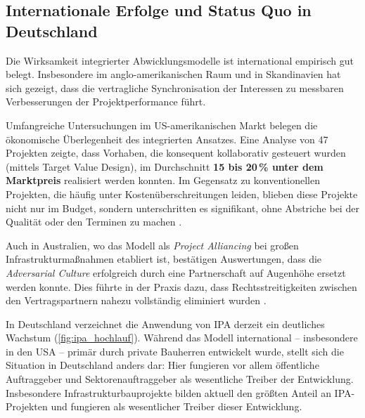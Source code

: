 \subsection{Internationale Erfolge und Status Quo in Deutschland}
\label{sec:2.2.3}

Die Wirksamkeit integrierter Abwicklungsmodelle ist international empirisch gut belegt. Insbesondere im anglo-amerikanischen Raum und in Skandinavien hat sich gezeigt, dass die vertragliche Synchronisation der Interessen zu messbaren Verbesserungen der Projektperformance führt.

Umfangreiche Untersuchungen im US-amerikanischen Markt belegen die ökonomische Überlegenheit des integrierten Ansatzes. Eine Analyse von 47 Projekten zeigte, dass Vorhaben, die konsequent kollaborativ gesteuert wurden (mittels Target Value Design), im Durchschnitt \textbf{15 bis 20\,\% unter dem Marktpreis} realisiert werden konnten. Im Gegensatz zu konventionellen Projekten, die häufig unter Kostenüberschreitungen leiden, blieben diese Projekte nicht nur im Budget, sondern unterschritten es signifikant, ohne Abstriche bei der Qualität oder den Terminen zu machen \autocite[Vgl.][S.~176]{do_target_2014}.

Auch in Australien, wo das Modell als \textit{Project Alliancing} bei großen Infrastrukturmaßnahmen etabliert ist, bestätigen Auswertungen, dass die \textit{Adversarial Culture} erfolgreich durch eine Partnerschaft auf Augenhöhe ersetzt werden konnte. Dies führte in der Praxis dazu, dass Rechtsstreitigkeiten zwischen den Vertragspartnern nahezu vollständig eliminiert wurden \autocite[Vgl.][S.~60]{lahdenpera_making_2012}.

In Deutschland verzeichnet die Anwendung von \acs{IPA} derzeit ein deutliches Wachstum (\cref{fig:ipa_hochlauf}). Während das Modell international – insbesondere in den USA – primär durch private Bauherren entwickelt wurde, stellt sich die Situation in Deutschland anders dar: Hier fungieren vor allem öffentliche Auftraggeber und Sektorenauftraggeber als wesentliche Treiber der Entwicklung. Insbesondere Infrastrukturbauprojekte bilden aktuell den größten Anteil an \acs{IPA}-Projekten und fungieren als wesentlicher Treiber dieser Entwicklung.\autocite[Vgl.][S.~10]{haghsheno_ipa-report_2025}

